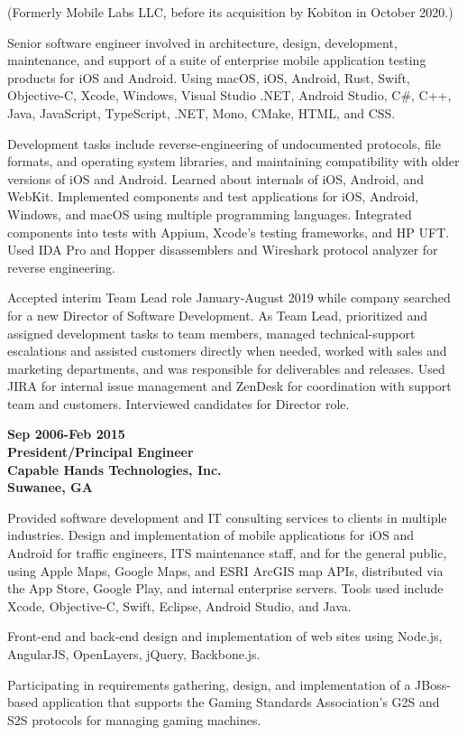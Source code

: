 (Formerly Mobile Labs LLC, before its acquisition by Kobiton in October
2020.)

Senior software engineer involved in architecture, design, development,
maintenance, and support of a suite of enterprise mobile application
testing products for iOS and Android. Using macOS, iOS, Android, Rust,
Swift, Objective-C, Xcode, Windows, Visual Studio .NET, Android Studio,
C\#, C++, Java, JavaScript, TypeScript, .NET, Mono, CMake, HTML, and
CSS.

Development tasks include reverse-engineering of undocumented protocols,
file formats, and operating system libraries, and maintaining
compatibility with older versions of iOS and Android. Learned about
internals of iOS, Android, and WebKit. Implemented components and test
applications for iOS, Android, Windows, and macOS using multiple
programming languages. Integrated components into tests with Appium,
Xcode's testing frameworks, and HP UFT. Used IDA Pro and Hopper
disassemblers and Wireshark protocol analyzer for reverse engineering.

Accepted interim Team Lead role January-August 2019 while company
searched for a new Director of Software Development. As Team Lead,
prioritized and assigned development tasks to team members, managed
technical-support escalations and assisted customers directly when
needed, worked with sales and marketing departments, and was responsible
for deliverables and releases. Used JIRA for internal issue management
and ZenDesk for coordination with support team and customers.
Interviewed candidates for Director role.

\textbf{Sep 2006-Feb 2015\\
President/Principal Engineer\\
Capable Hands Technologies, Inc.\\
Suwanee, GA}

Provided software development and IT consulting services to clients in
multiple industries. Design and implementation of mobile applications
for iOS and Android for traffic engineers, ITS maintenance staff, and
for the general public, using Apple Maps, Google Maps, and ESRI ArcGIS
map APIs, distributed via the App Store, Google Play, and internal
enterprise servers. Tools used include Xcode, Objective-C, Swift,
Eclipse, Android Studio, and Java.

Front-end and back-end design and implementation of web sites using
Node.js, AngularJS, OpenLayers, jQuery, Backbone.js.

Participating in requirements gathering, design, and implementation of a
JBoss-based application that supports the Gaming Standards Association's
G2S and S2S protocols for managing gaming machines.

